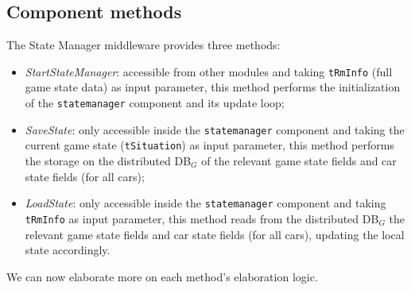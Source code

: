 \subsection{Component methods}
The State Manager middleware provides three methods:
\begin{itemize}
	\item \textit{StartStateManager}: accessible from other modules and taking \texttt{tRmInfo} (full game state data) as input parameter, this method performs the initialization of the \texttt{statemanager} component and its update loop;
	\item \textit{SaveState}: only accessible inside the \texttt{statemanager} component and taking the current game state (\texttt{tSituation}) as input parameter, this method performs the storage on the distributed DB$_G$ of the relevant game state fields and car state fields (for all cars);
	\item \textit{LoadState}: only accessible inside the \texttt{statemanager} component and taking \texttt{tRmInfo} as input parameter, this method reads from the distributed DB$_G$ the relevant game state fields and car state fields (for all cars), updating the local state accordingly.
\end{itemize}
We can now elaborate more on each method's elaboration logic.

